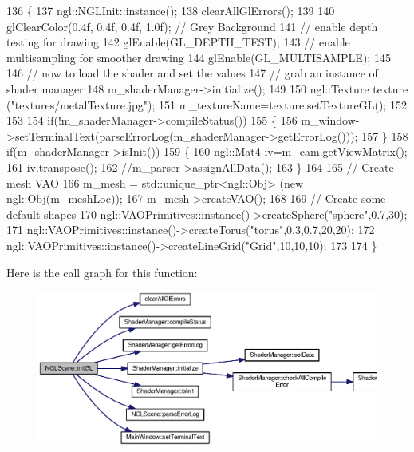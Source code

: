 \begin{DoxyCode}
136 \{
137   ngl::NGLInit::instance();
138   clearAllGlErrors();
139 
140   glClearColor(0.4f, 0.4f, 0.4f, 1.0f);        \textcolor{comment}{// Grey Background}
141   \textcolor{comment}{// enable depth testing for drawing}
142   glEnable(GL\_DEPTH\_TEST);
143   \textcolor{comment}{// enable multisampling for smoother drawing}
144   glEnable(GL\_MULTISAMPLE);
145 
146   \textcolor{comment}{// now to load the shader and set the values}
147   \textcolor{comment}{// grab an instance of shader manager}
148   m_shaderManager->initialize();
149 
150   ngl::Texture texture (\textcolor{stringliteral}{"textures/metalTexture.jpg"});
151   m_textureName=texture.setTextureGL();
152 
153 
154   \textcolor{keywordflow}{if}(!m_shaderManager->compileStatus())
155   \{
156     m_window->setTerminalText(parseErrorLog(m_shaderManager->getErrorLog()));
157   \}
158   \textcolor{keywordflow}{if}(m_shaderManager->isInit())
159   \{
160     ngl::Mat4 iv=m_cam.getViewMatrix();
161     iv.transpose();
162     \textcolor{comment}{//m\_parser->assignAllData();}
163   \}
164 
165   \textcolor{comment}{// Create mesh VAO}
166   m_mesh = std::unique\_ptr<ngl::Obj> (\textcolor{keyword}{new} ngl::Obj(m_meshLoc));
167   m_mesh->createVAO();
168 
169   \textcolor{comment}{// Create some default shapes}
170   ngl::VAOPrimitives::instance()->createSphere(\textcolor{stringliteral}{"sphere"},0.7,30);
171   ngl::VAOPrimitives::instance()->createTorus(\textcolor{stringliteral}{"torus"},0.3,0.7,20,20);
172   ngl::VAOPrimitives::instance()->createLineGrid(\textcolor{stringliteral}{"Grid"},10,10,10);
173 
174 \}
\end{DoxyCode}


Here is the call graph for this function\-:\nopagebreak
\begin{figure}[H]
\begin{center}
\leavevmode
\includegraphics[width=350pt]{class_n_g_l_scene_a40efee086fe1c2c956e6d66774d9d18f_cgraph}
\end{center}
\end{figure}




